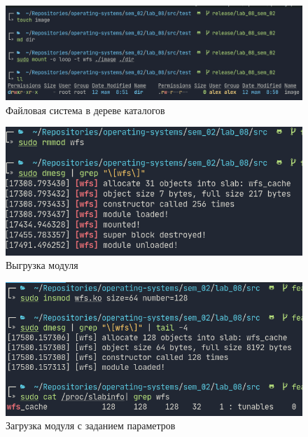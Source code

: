 \begin{figure}[H]
    \centering
    \includegraphics[scale=0.45]{img/root.png}
    \caption{Файловая система в дереве каталогов}
\end{figure}

\begin{figure}[H]
    \centering
    \includegraphics[scale=0.6]{img/unload.png}
    \caption{Выгрузка модуля}
\end{figure}

\begin{figure}[H]
    \centering
    \includegraphics[scale=0.6]{img/parameters.png}
    \caption{Загрузка модуля с заданием параметров}
\end{figure}

